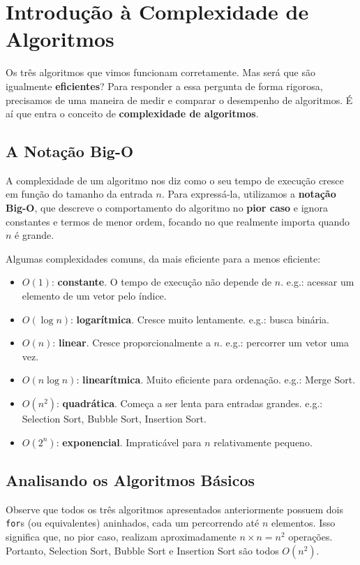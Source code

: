 \documentclass[12pt]{article}
\begin{document}
\section{Introdução à Complexidade de Algoritmos}

Os três algoritmos que vimos funcionam corretamente. Mas será que são igualmente \textbf{eficientes}? Para responder a essa pergunta de forma rigorosa, precisamos de uma maneira de medir e comparar o desempenho de algoritmos. É aí que entra o conceito de \textbf{complexidade de algoritmos}.

\subsection{A Notação Big-O}

A complexidade de um algoritmo nos diz como o seu tempo de execução cresce em função do tamanho da entrada $n$. Para expressá-la, utilizamos a \textbf{notação Big-O}, que descreve o comportamento do algoritmo no \textbf{pior caso} e ignora constantes e termos de menor ordem, focando no que realmente importa quando $n$ é grande.

Algumas complexidades comuns, da mais eficiente para a menos eficiente:

\begin{itemize}
    \item $O(1)$: \textbf{constante}. O tempo de execução não depende de $n$. e.g.: acessar um elemento de um vetor pelo índice.
    \item $O(\log n)$: \textbf{logarítmica}. Cresce muito lentamente. e.g.: busca binária.
    \item $O(n)$: \textbf{linear}. Cresce proporcionalmente a $n$. e.g.: percorrer um vetor uma vez.
    \item $O(n \log n)$: \textbf{linearítmica}. Muito eficiente para ordenação. e.g.: Merge Sort.
    \item $O(n^2)$: \textbf{quadrática}. Começa a ser lenta para entradas grandes. e.g.: Selection Sort, Bubble Sort, Insertion Sort.
    \item $O(2^n)$: \textbf{exponencial}. Impraticável para $n$ relativamente pequeno.
\end{itemize}

\subsection{Analisando os Algoritmos Básicos}

Observe que todos os três algoritmos apresentados anteriormente possuem dois \texttt{for}s (ou equivalentes) aninhados, cada um percorrendo até $n$ elementos. Isso significa que, no pior caso, realizam aproximadamente $n \times n = n^2$ operações. Portanto, Selection Sort, Bubble Sort e Insertion Sort são todos $O(n^2)$.
\end{document}
